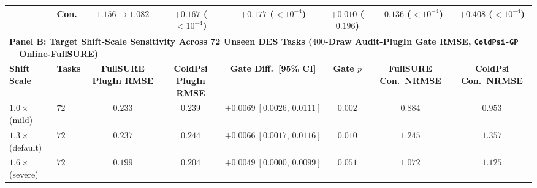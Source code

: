 \begin{table}[htbp]
{\begin{tabular}{llcccccc}
 & Con. & $1.156\!\to\!1.082$ & $+0.167$ ($<10^{-4}$) & $+0.177$ ($<10^{-4}$) & $+0.010$ ($0.196$) & $+0.136$ ($<10^{-4}$) & $+0.408$ ($<10^{-4}$) \\
\midrule
\multicolumn{8}{l}{\textbf{Panel B: Target Shift-Scale Sensitivity Across 72 Unseen DES Tasks ($400$-Draw Audit-PlugIn Gate RMSE, \texttt{ColdPsi-GP} $-$ \textbf{Online-FullSURE})}} \\
\textbf{Shift Scale} & \textbf{Tasks} & \textbf{FullSURE PlugIn RMSE} & \textbf{ColdPsi PlugIn RMSE} & \textbf{Gate Diff.\ [95\% CI]} & \textbf{Gate $p$} & \textbf{FullSURE Con.\ NRMSE} & \textbf{ColdPsi Con.\ NRMSE} \\
\midrule
$1.0\times$ (mild) & $72$ & $0.233$ & $0.239$ & $+0.0069\ [0.0026,\,0.0111]$ & $0.002$ & $0.884$ & $0.953$ \\
$1.3\times$ (default) & $72$ & $0.237$ & $0.244$ & $+0.0066\ [0.0017,\,0.0116]$ & $0.010$ & $1.245$ & $1.357$ \\
$1.6\times$ (severe) & $72$ & $0.199$ & $0.204$ & $+0.0049\ [0.0000,\,0.0099]$ & $0.051$ & $1.072$ & $1.125$ \\
\bottomrule
\end{tabular}%
}
\end{table}

